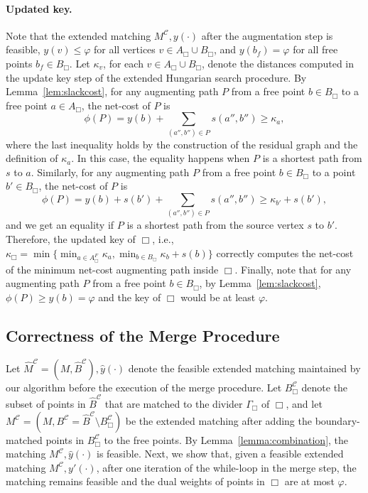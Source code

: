 \documentclass[11pt,onecolumn]{article}
\def\mcC{{\mathcal{C}}}
\newcommand{\cell}{\Box}
\newcommand{\ymax}{\varphi}
\newcommand\myparagraph[1]{\paragraph{#1}}
\begin{document}
\myparagraph{Updated key.} Note that the extended matching $M^\mcC, y(\cdot)$ after the augmentation step is feasible, $y(v)\le \ymax$ for all vertices $v\in A_\cell\cup B_\cell$, and $y(b_f)=\ymax$ for all free points $b_f\in B_\cell$. Let $\kappa_v$, for each $v\in A_\cell\cup B_\cell$, denote the distances computed in the update key step of the extended Hungarian search procedure. By Lemma~\ref{lem:slackcost}, for any augmenting path $P$ from a free point $b\in B_\cell$ to a free point $a\in A_\cell$, the net-cost of $P$ is 
\[\phi(P)=y(b) +\sum_{(a'',b'')\in P}s(a'',b'') \ge \kappa_a,\] where the last inequality holds by the construction of the residual graph and the definition of $\kappa_a$. In this case, the equality happens when $P$ is a shortest path from $s$ to $a$. Similarly, for any augmenting path $P$ from a free point $b\in B_\cell$ to a point $b'\in B_\cell$, the net-cost of $P$ is 
\[\phi(P)=y(b) + s(b') +\sum_{(a'',b'')\in P}s(a'',b'') \ge \kappa_{b'} + s(b'),\]
and we get an equality if $P$ is a shortest path from the source vertex $s$ to $b'$.
Therefore, the updated key of $\cell$, i.e., $\kappa_\cell=\min\{\min_{a\in A_\cell^F}\kappa_a, \min_{b\in B_\cell}\kappa_b+s(b)\}$ correctly computes the net-cost of the minimum net-cost augmenting path inside $\cell$. Finally, note that for any augmenting path $P$ from a free point $b\in B_\cell$, by Lemma~\ref{lem:slackcost}, $\phi(P)\ge y(b)=\ymax$ and the key of $\cell$ would be at least $\ymax$.



\subsection{Correctness of the Merge Procedure}\label{subsec:merge_correctness}

\mergeProp*
Let $\hat{M}^\mcC=(M, \hat{B}^\mcC), \hat{y}(\cdot)$ denote the feasible extended matching maintained by our algorithm before the execution of the merge procedure. Let $B^\mcC_\cell$ denote the subset of points in $\hat{B}^\mcC$ that are matched to the divider $\Gamma_\cell$ of $\cell$, and let $M^\mcC=(M, B^\mcC = \hat{B}^\mcC\setminus B^\mcC_\cell)$ be the extended matching after adding the boundary-matched points in $B_\cell^\mcC$ to the free points. By Lemma~\ref{lemma:combination}, the matching $M^\mcC, \hat{y}(\cdot)$ is feasible. Next, we show that, given a feasible extended matching $M^\mcC, y'(\cdot)$, after one iteration of the while-loop in the merge step, the matching remains feasible and the dual weights of points in $\cell$ are at most $\ymax$.
\end{document}
